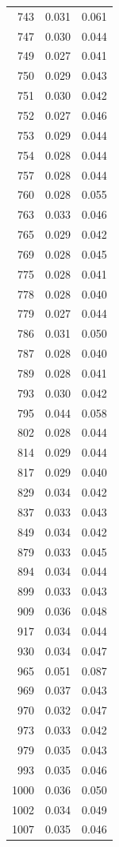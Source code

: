 \begin{tabular}{rrr}
743 & 0.031 & 0.061 \\
747 & 0.030 & 0.044 \\
749 & 0.027 & 0.041 \\
750 & 0.029 & 0.043 \\
751 & 0.030 & 0.042 \\
752 & 0.027 & 0.046 \\
753 & 0.029 & 0.044 \\
754 & 0.028 & 0.044 \\
757 & 0.028 & 0.044 \\
760 & 0.028 & 0.055 \\
763 & 0.033 & 0.046 \\
765 & 0.029 & 0.042 \\
769 & 0.028 & 0.045 \\
775 & 0.028 & 0.041 \\
778 & 0.028 & 0.040 \\
779 & 0.027 & 0.044 \\
786 & 0.031 & 0.050 \\
787 & 0.028 & 0.040 \\
789 & 0.028 & 0.041 \\
793 & 0.030 & 0.042 \\
795 & 0.044 & 0.058 \\
802 & 0.028 & 0.044 \\
814 & 0.029 & 0.044 \\
817 & 0.029 & 0.040 \\
829 & 0.034 & 0.042 \\
837 & 0.033 & 0.043 \\
849 & 0.034 & 0.042 \\
879 & 0.033 & 0.045 \\
894 & 0.034 & 0.044 \\
899 & 0.033 & 0.043 \\
909 & 0.036 & 0.048 \\
917 & 0.034 & 0.044 \\
930 & 0.034 & 0.047 \\
965 & 0.051 & 0.087 \\
969 & 0.037 & 0.043 \\
970 & 0.032 & 0.047 \\
973 & 0.033 & 0.042 \\
979 & 0.035 & 0.043 \\
993 & 0.035 & 0.046 \\
1000 & 0.036 & 0.050 \\
1002 & 0.034 & 0.049 \\
1007 & 0.035 & 0.046 \\

\end{tabular}
